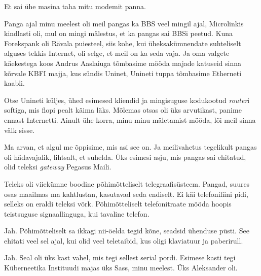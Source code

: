 
Et sai ühe masina taha  mitu modemit panna.


Panga ajal minu meelest oli meil pangas ka BBS veel mingil ajal, 
Microlinkis kindlasti oli, mul on mingi mälestus, et ka pangas 
sai BBSi peetud. Kuna Forekspank oli Rävala puiesteel, siis  kohe, kui 
üheksakümnendate suhteliselt alguses tekkis Internet, oli selge, et meil on ka 
seda vaja. Ja oma valgete käekestega koos Andrus Aaslaiuga tõmbasime mööda majade katuseid sinna kõrvale KBFI majja, 
kus sündis Uninet, Unineti tuppa tõmbasime Etherneti kaabli.

Otse Unineti küljes, ühed esimesed kliendid ja mingisuguse kodukootud 
\emph{router}i softiga, mis flopi pealt käima läks. Mõlemas otsas oli üks 
arvutikast, panime ennast Internetti. Ainult ühe korra, minu minu mäletamist 
mööda, lõi meil sinna välk sisse.


Ma arvan, et algul me õppisime, mis asi see on. Ja meilivahetus tegelikult 
pangas oli hädavajalik, lihtsalt, et  suhelda. Üks esimesi asju, mis pangas sai 
ehitatud, olid teleksi \emph{gateway} Pegasus Maili. 


Teleks oli viiekümne boodine põhimõtteliselt telegraafisüsteem. Pangad, suures 
osas maailmas ma kahtlustan, kasutavad seda endiselt. Ei käi telefoniliini 
pidi, selleks on eraldi teleksi võrk. Põhimõtteliselt telefonitraate mööda 
hoopis teistsuguse signaallinguga,  kui tavaline telefon.


Jah. Põhimõtteliselt sa ikkagi  nii-öelda tegid kõne, seadsid ühenduse püsti. 
See ehitati veel sel ajal, kui olid veel  teletaibid, kus oligi klaviatuur ja 
paberirull.


Jah. Seal oli üks kast vahel, mis tegi sellest serial pordi. Esimese kasti tegi 
Küberneetika Instituudi majas üks Sass, minu 
meelest. Üks Aleksander oli.

